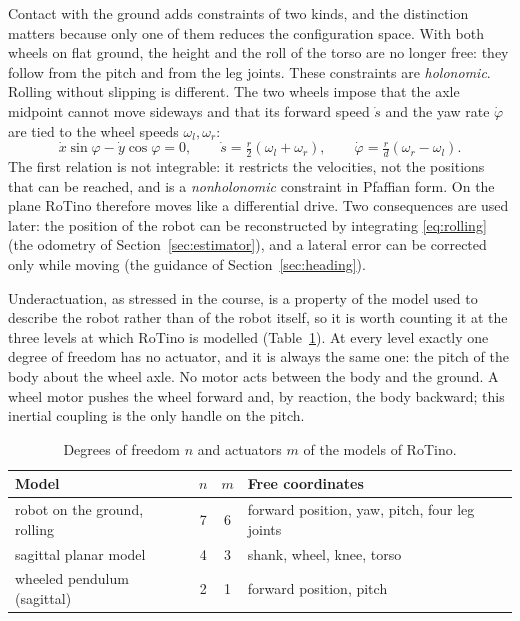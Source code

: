 \documentclass[11pt,a4paper]{article}
\begin{document}
Contact with the ground adds constraints of two kinds, and the distinction matters because only one of them reduces
the configuration space. With both wheels on flat ground, the height and the roll of the torso are no longer free:
they follow from the pitch and from the leg joints. These constraints are \emph{holonomic}. Rolling without slipping
is different. The two wheels impose that the axle midpoint cannot move sideways and that its forward speed $\dot s$
and the yaw rate $\dot\varphi$ are tied to the wheel speeds $\omega_l,\omega_r$:
\begin{equation}
  \dot x\sin\varphi-\dot y\cos\varphi=0,\qquad
  \dot s=\tfrac{r}{2}(\omega_l+\omega_r),\qquad \dot\varphi=\tfrac{r}{d}(\omega_r-\omega_l).
  \label{eq:rolling}
\end{equation}
The first relation is not integrable: it restricts the velocities, not the positions that can be reached, and
is a \emph{nonholonomic} constraint in Pfaffian form. On the plane RoTino therefore moves like a differential
drive. Two consequences are used later: the position of the robot can be reconstructed by integrating
\eqref{eq:rolling} (the odometry of Section~\ref{sec:estimator}), and a lateral error can be corrected only while
moving (the guidance of Section~\ref{sec:heading}).

Underactuation, as stressed in the course, is a property of the model used to describe the robot rather than of the
robot itself, so it is worth counting it at the three levels at which RoTino is modelled (Table~\ref{tab:under}). At
every level exactly one degree of freedom has no actuator, and it is always the same one: the pitch of the body
about the wheel axle. No motor acts between the body and the ground. A wheel motor pushes the wheel forward and,
by reaction, the body backward; this inertial coupling is the only handle on the pitch.

\begin{table}[t]
  \centering\small
  \caption{Degrees of freedom $n$ and actuators $m$ of the models of RoTino.}
  \label{tab:under}
  \begin{tabular}{@{}lccl@{}}
    \toprule
    Model & $n$ & $m$ & Free coordinates \\
    \midrule
    robot on the ground, rolling & 7 & 6 & forward position, yaw, pitch, four leg joints \\
    sagittal planar model & 4 & 3 & shank, wheel, knee, torso \\
    wheeled pendulum (sagittal) & 2 & 1 & forward position, pitch \\
    \bottomrule
  \end{tabular}
\end{table}
\end{document}

